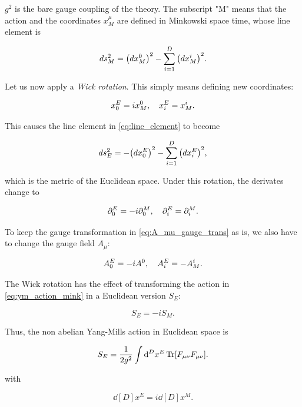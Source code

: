\documentclass[reqno,12pt]{article}
\numberwithin{equation}{section}
\begin{document}
$g^2$ is the bare gauge coupling of the theory. The subscript "M" means that the action and the coordinates $x_M^\mu$ are defined
in Minkowski space time, whose line element is

\begin{equation} \label{eq:line_element}
	ds_M^2 = \qty(dx_M^0)^2 - \sum_{i=1}^D \qty(dx_M^i)^2.
\end{equation}

Let us now apply a \textit{Wick rotation}. This simply means defining new coordinates:

\begin{equation}
	x_0^E = i x^0_M \qc x_i^E = x_M^i.
\end{equation}

This causes the line element in \eqref{eq:line_element} to become

\begin{equation}
	ds_E^2 = -\qty(dx^E_0)^2 - \sum_{i=1}^D \qty(dx^E_i)^2,
\end{equation}

which is the metric of the Euclidean space. Under this rotation, the derivates change to

\begin{equation}
	\partial_0^E = -i \partial_0^M \qc \partial_i^E = \partial_i^M.
\end{equation}

To keep the gauge transformation in \eqref{eq:A_mu_gauge_trans} as is, we also have to change the gauge field $A_\mu$:

\begin{equation}
	A_0^E = -i A^0 \qc A_i^E = -A^i_M.
\end{equation}

The Wick rotation has the effect of transforming the action in \eqref{eq:ym_action_mink} in a Euclidean version $S_E$:

\begin{equation}
	S_E = -i S_M.
\end{equation}

Thus, the non abelian Yang-Mills action in Euclidean space is

\begin{equation} \label{eq:ym_action}
	S_E = \frac{1}{2g^2} \int \dd[D]{x^E} \Tr[F_{\mu\nu}F_{\mu\nu}].
\end{equation}

with 

\begin{equation}
	\dd[D]{x^E} = i \dd[D]{x^M}.
\end{equation}
\end{document}
